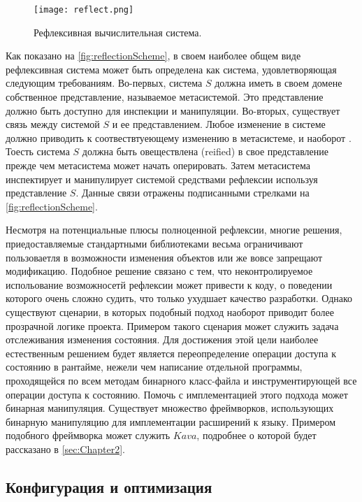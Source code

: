 \begin{figure}[h]
\centering
\texttt{[image: reflect.png]}
\caption{Рефлексивная вычислительная система.}
\label{fig:reflectionScheme}
\end{figure}

Как показано на \autoref{fig:reflectionScheme}, в своем наиболее общем виде рефлексивная система может быть определена как система, удовлетворяющая следующим требованиям. Во-первых, система $S$ должна иметь в своем домене собственное представление, называемое метасистемой. Это представление должно быть доступно для инспекции и манипуляции. Во-вторых, существует связь между системой $S$ и ее представлением. Любое изменение в системе должно приводить к соотвествтуеющему изменению в метасистеме, и наоборот \cite{javaReflection}. Тоесть система $S$ должна быть овеществлена (reified) в свое представление прежде чем метасистема может начать оперировать. Затем метасистема инспектирует и манипулирует системой средствами рефлексии используя представление $S$. Данные связи отражены подписанными стрелками на \autoref{fig:reflectionScheme}.

Несмотря на потенциальные плюсы полноценной рефлексии, многие решения, приедоставляемые стандартными библиотеками весьма ограничивают пользоваетля в возможности изменения объектов или же вовсе запрещают модификацию. Подобное решение связано с тем, что неконтролируемое испольование возможносетй рефлексии может привести к коду, о поведении которого очень сложно судить, что только ухудшает качество разработки. Однако существуют сценарии, в которых подобный подход наоборот приводит более прозрачной логике проекта. Примером такого сценария может служить задача отслеживания изменения состояния. Для достижения этой цели наиболее естественным решением будет является переопределение операции доступа к состоянию в рантайме, нежели чем написание отдельной программы, проходящейся по всем методам бинарного класс-файла и инструментирующей все операции доступа к состоянию. Помочь с имплементацией этого подхода может бинарная манипуляция. Существует множество фреймворков, использующих бинарную манипуляцию для имплементации расширений к языку. Примером подобного фреймворка может служить $Kava$, подробнее о которой будет рассказано в \autoref{sec:Chapter2}.

\subsection{Конфигурация и оптимизация}

